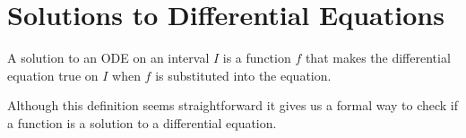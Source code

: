\section{Solutions to Differential Equations}
\begin{definition}
	A solution to an ODE on an interval $I$ is a function $f$ that makes the differential equation true on $I$ when $f$ is substituted into the equation.
\end{definition}
\noindent
Although this definition seems straightforward it gives us a formal way to check if a function is a solution to a differential equation.

\ifodd{}\fi